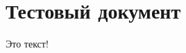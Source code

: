 \documentclass[__PROJECT-NAME__.tex]{subfiles}
\begin{document}
\section{Тестовый документ}\label{sec:example:test}

Это текст!
\end{document}

